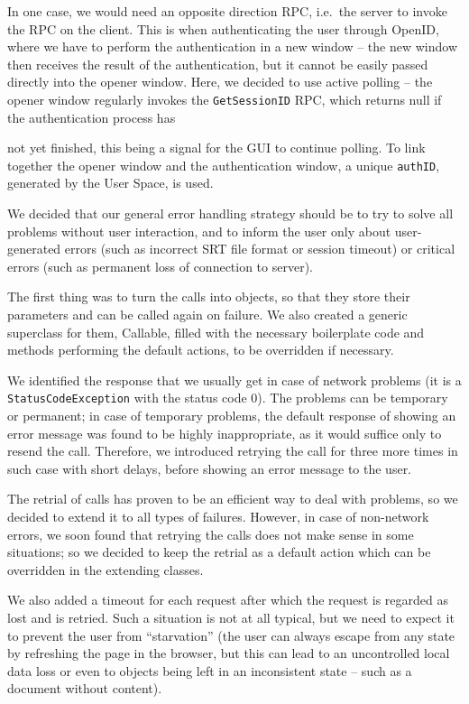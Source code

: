 In one case, we would need an opposite direction RPC, i.e.\ the server to invoke the RPC on the client. This is when authenticating the user through OpenID, where we have to perform the authentication in a new window -- the new window then receives the result of the authentication, but it cannot be easily passed directly into the opener window. Here, we decided to use active polling -- the opener window regularly invokes the {\tt GetSessionID} RPC, which returns null if the authentication process has{ not yet finished, this being a signal for the GUI to continue polling. To link together the opener window and the authentication window, a unique {\tt authID}, generated by the User Space, is used.


We decided that our general error handling strategy should be to try to solve all problems without user interaction, and to inform the user only about user-generated errors (such as incorrect SRT file format or session timeout) or critical errors (such as permanent loss of connection to server).

The first thing was to turn the calls into objects, so that they store their parameters and can be called again on failure. We also created a generic superclass for them, Callable, filled with the necessary boilerplate code and methods performing the default actions, to be overridden if necessary.

We identified the response that we usually get in case of network problems (it is a {\tt StatusCodeException} with the status code 0). The problems can be temporary or permanent; in case of temporary problems, the default response of showing an error message was found to be highly inappropriate, as it would suffice only to resend the call. Therefore, we introduced retrying the call for three more times in such case with short delays, before showing an error message to the user.

The retrial of calls has proven to be an efficient way to deal with problems, so we decided to extend it to all types of failures. However, in case of non-network errors, we soon found that retrying the calls does not make sense in some situations; so we decided to keep the retrial as a default action which can be overridden in the extending classes.

We also added a timeout for each request after which the request is regarded as lost and is retried. Such a situation is not at all typical, but we need to expect  it to prevent the user from ``starvation'' (the user can always escape from any state by refreshing the page in the browser, but this can lead to an uncontrolled local data loss or even to objects being left in an inconsistent state -- such as a document without content).



}

